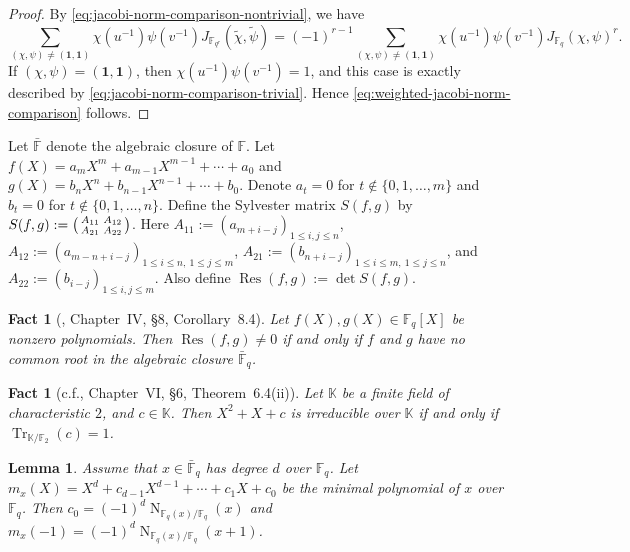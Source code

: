 \documentclass[10pt,a4paper]{article}
\newtheorem{lem}[thm]{Lemma}
\newtheorem{fac}[thm]{Fact}
\newcommand{\Tr}{\operatorname{Tr}}
\newcommand{\Norm}{\operatorname{N}}
\newcommand{\Res}{\operatorname{Res}}
\newcommand{\one}{\mathbf{1}}
\numberwithin{equation}{section}
\begin{document}
\begin{proof}
By \eqref{eq:jacobi-norm-comparison-nontrivial}, we have
\[
\sum_{(\chi,\psi)\neq(\one,\one)}
\chi(u^{-1})\psi(v^{-1})J_{\mathbb{F}_{q^r}}(\widetilde{\chi},\widetilde{\psi})
=
(-1)^{r-1}
\sum_{(\chi,\psi)\neq(\one,\one)}
\chi(u^{-1})\psi(v^{-1})J_{\mathbb{F}_q}(\chi,\psi)^r.
\]
If $(\chi,\psi)=(\one,\one)$, then $\chi(u^{-1})\psi(v^{-1})=1$, and this case is exactly described by \eqref{eq:jacobi-norm-comparison-trivial}. Hence \eqref{eq:weighted-jacobi-norm-comparison} follows.
\end{proof}



Let $\bar{\mathbb{F}}$ denote the algebraic closure of $\mathbb{F}$.
Let $f(X)=a_mX^m+a_{m-1}X^{m-1}+\cdots+a_0$ and
$g(X)=b_nX^n+b_{n-1}X^{n-1}+\cdots+b_0$.
Denote $a_t=0$ for $t\notin\{0,1,\dotsc,m\}$ and $b_t=0$ for $t\notin\{0,1,\dotsc,n\}$.
Define the Sylvester matrix $S(f,g)$ by
$S(f,g):=\begin{psmallmatrix} A_{11} & A_{12}\\ A_{21} & A_{22}\end{psmallmatrix}$.
Here $A_{11}:=(a_{m+i-j})_{1\le i,j\le n}$, $A_{12}:=(a_{m-n+i-j})_{1\le i\le n,\ 1\le j\le m}$, $A_{21}:=(b_{n+i-j})_{1\le i\le m,\ 1\le j\le n}$, and $A_{22}:=(b_{i-j})_{1\le i,j\le m}$.
Also define $\Res(f,g):=\det S(f,g)$.

\begin{fac}[\cite{Lang2002}, Chapter~IV, \S 8, Corollary~8.4]\label{fac:resultant-common-root}
Let $f(X), g(X)\in \mathbb{F}_q[X]$ be nonzero polynomials. Then $\Res(f,g)\neq 0$ if and only if $f$ and $g$ have no common root in the algebraic closure $\bar{\mathbb{F}}_q$.
\end{fac}

\begin{fac}[c.f.\cite{Lang2002}, Chapter~VI, \S 6, Theorem~6.4\textup{(ii)}]\label{fac:artin-schreier-quadratic}
Let $\mathbb{K}$ be a finite field of characteristic $2$, and $c\in\mathbb{K}$. Then $X^2+X+c$ is irreducible over $\mathbb{K}$ if and only if $\Tr_{\mathbb{K}/\mathbb{F}_2}(c)=1$.
\end{fac}



\begin{lem}\label{lem:minpoly-norm}
Assume that $x\in\bar{\mathbb{F}}_q$ has degree $d$ over $\mathbb{F}_q$. Let 
$m_x(X)=X^d+c_{d-1}X^{d-1}+\cdots+c_{1}X+c_{0}$ be the minimal polynomial of $x$ over $\mathbb{F}_q$.
Then $c_0=(-1)^d\Norm_{\mathbb{F}_q(x)/\mathbb{F}_q}(x)$ and $m_x(-1)=(-1)^d\Norm_{\mathbb{F}_q(x)/\mathbb{F}_q}(x+1)$.
\end{lem}
\end{document}
